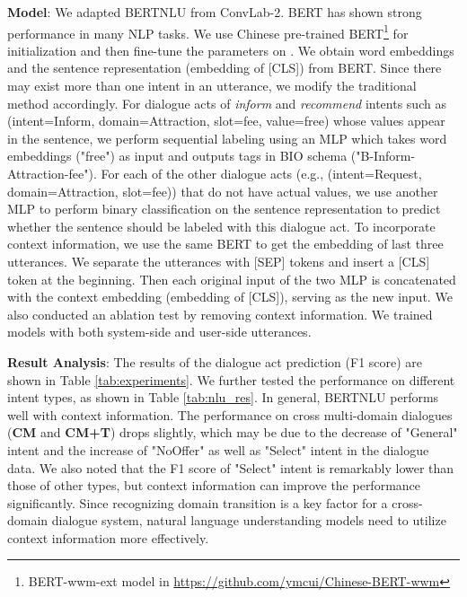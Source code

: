 \noindent\textbf{Model}:
We adapted BERTNLU from ConvLab-2. 
BERT \cite{bert2019} has shown strong performance in many NLP tasks. 
We use Chinese pre-trained BERT\footnote{BERT-wwm-ext model in \url{https://github.com/ymcui/Chinese-BERT-wwm}} \cite{chineseBERT2019}
for initialization and then fine-tune the parameters on \datasetName.
We obtain word embeddings and the sentence representation (embedding of [CLS]) from BERT. 
Since there may exist more than one intent in an utterance, we modify the traditional method accordingly. 
For dialogue acts of \emph{inform} and \emph{recommend} intents such as (intent=Inform, domain=Attraction, slot=fee, value=free) whose values appear in the sentence, we perform sequential labeling using an MLP which takes word embeddings ("free") as input and outputs tags in BIO schema ("B-Inform-Attraction-fee"). 
For each of the other dialogue acts (e.g., (intent=Request, domain=Attraction, slot=fee)) that do not have actual values, we use another MLP to perform binary classification on the sentence representation to predict whether the sentence should be labeled with this dialogue act.
To incorporate context information, we use the same BERT to get the embedding of last three utterances. We separate the utterances with [SEP] tokens and insert a [CLS] token at the beginning. 
Then each original input of the two MLP is concatenated with the context embedding (embedding of [CLS]), serving as the new input.
We also conducted an ablation test by removing context information. 
We trained models with both system-side and user-side utterances.

\begin{table}[]
    \footnotesize
    \centering
    \caption{F1 score of different intent type. "Recom." represents "Recommend".}
    \label{tab:nlu_res}
\end{table}

\noindent\textbf{Result Analysis}:
The results of the dialogue act prediction (F1 score) are shown in Table \ref{tab:experiments}. We further tested the performance on different intent types, as shown in Table \ref{tab:nlu_res}. 
In general, BERTNLU performs well with context information.
The performance on cross multi-domain dialogues (\textbf{CM} and \textbf{CM+T}) drops slightly, which may be due to the decrease of "General" intent and the increase of "NoOffer" as well as "Select" intent in the dialogue data.
We also noted that the F1 score of "Select" intent is remarkably lower than those of other types, but context information can improve the performance significantly.
Since recognizing domain transition is a key factor for a cross-domain dialogue system, natural language understanding models need to utilize context information more effectively.

